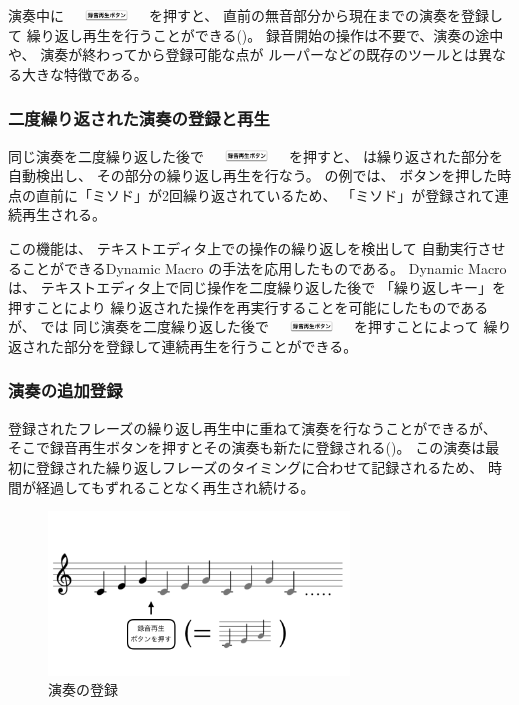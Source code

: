 演奏中に
\includegraphics[height=3mm,width=20mm,bb=3 23 360 80]{images/recbutton.png}
を押すと、
直前の無音部分から現在までの演奏を登録して
繰り返し再生を行うことができる()。
%
録音開始の操作は不要で、演奏の途中や、
演奏が終わってから登録可能な点が
ルーパーなどの既存のツールとは異なる大きな特徴である。

\subsubsection{二度繰り返された演奏の登録と再生}

同じ演奏を二度繰り返した後で
\includegraphics[height=3mm,width=20mm,bb=3 23 360 80]{images/recbutton.png}
を押すと、
{\system}は繰り返された部分を自動検出し、
その部分の繰り返し再生を行なう。
の例では、
ボタンを押した時点の直前に「ミソド」が2回繰り返されているため、
「ミソド」が登録されて連続再生される。

この機能は、
テキストエディタ上での操作の繰り返しを検出して
自動実行させることができるDynamic Macro\cite{masui}
の手法を応用したものである。
Dynamic Macroは、
テキストエディタ上で同じ操作を二度繰り返した後で
「繰り返しキー」を押すことにより
繰り返された操作を再実行することを可能にしたものであるが、
{\system}では
同じ演奏を二度繰り返した後で
\includegraphics[height=3mm,width=20mm,bb=3 23 360 80]{images/recbutton.png}
を押すことによって
繰り返された部分を登録して連続再生を行うことができる。

\subsubsection{演奏の追加登録}

登録されたフレーズの繰り返し再生中に重ねて演奏を行なうことができるが、
そこで録音再生ボタンを押すとその演奏も新たに登録される()。
この演奏は最初に登録された繰り返しフレーズのタイミングに合わせて記録されるため、
時間が経過してもずれることなく再生され続ける。

\begin{figure}[tb]
\includegraphics[width=8cm,bb=0 0 926 504]{images/rp1.png}
\centering
\caption{演奏の登録}
\label{recplay1}
\end{figure}

